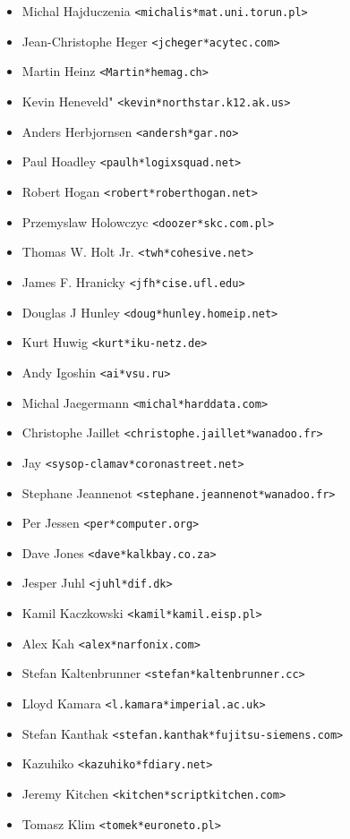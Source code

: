 \documentclass[a4paper,titlepage,12pt]{article}
\newcommand{\email}[1]{\texttt{#1}}
\begin{document}
\begin{itemize}
	\item Michal Hajduczenia \email{<michalis*mat.uni.torun.pl>}
	\item Jean-Christophe Heger \email{<jcheger*acytec.com>}
	\item Martin Heinz \email{<Martin*hemag.ch>}
	\item Kevin Heneveld" \email{<kevin*northstar.k12.ak.us>}
	\item Anders Herbjornsen \email{<andersh*gar.no>}
	\item Paul Hoadley \email{<paulh*logixsquad.net>}
	\item Robert Hogan \email{<robert*roberthogan.net>}
	\item Przemyslaw Holowczyc \email{<doozer*skc.com.pl>}
	\item Thomas W. Holt Jr. \email{<twh*cohesive.net>}
	\item James F.  Hranicky \email{<jfh*cise.ufl.edu>}
	\item Douglas J Hunley \email{<doug*hunley.homeip.net>}
	\item Kurt Huwig \email{<kurt*iku-netz.de>}
	\item Andy Igoshin \email{<ai*vsu.ru>}
	\item Michal Jaegermann \email{<michal*harddata.com>}
	\item Christophe Jaillet \email{<christophe.jaillet*wanadoo.fr>}
	\item Jay \email{<sysop-clamav*coronastreet.net>}
	\item Stephane Jeannenot \email{<stephane.jeannenot*wanadoo.fr>}
	\item Per Jessen \email{<per*computer.org>}
	\item Dave Jones \email{<dave*kalkbay.co.za>}
	\item Jesper Juhl \email{<juhl*dif.dk>}
	\item Kamil Kaczkowski \email{<kamil*kamil.eisp.pl>}
	\item Alex Kah \email{<alex*narfonix.com>}
	\item Stefan Kaltenbrunner \email{<stefan*kaltenbrunner.cc>}
	\item Lloyd Kamara \email{<l.kamara*imperial.ac.uk>}
	\item Stefan Kanthak \email{<stefan.kanthak*fujitsu-siemens.com>}
	\item Kazuhiko \email{<kazuhiko*fdiary.net>}
	\item Jeremy Kitchen \email{<kitchen*scriptkitchen.com>}
	\item Tomasz Klim \email{<tomek*euroneto.pl>}

\end{itemize}
\end{document}
